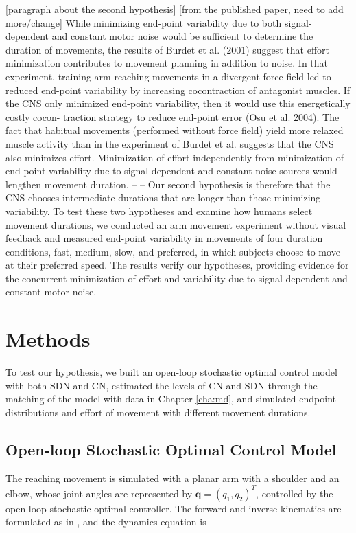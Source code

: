 [paragraph about the second hypothesis] [from the published paper, need to add more/change] While minimizing end-point variability due to both signal- dependent and constant motor noise would be sufficient to determine the duration of movements, the results of Burdet et al. (2001) suggest that effort minimization contributes to movement planning in addition to noise. In that experiment, training arm reaching movements in a divergent force field led to reduced end-point variability by increasing cocontraction of antagonist muscles. If the CNS only minimized end-point variability, then it would use this energetically costly cocon- traction strategy to reduce end-point error (Osu et al. 2004). The fact that habitual movements (performed without force field) yield more relaxed muscle activity than in the experiment of Burdet et al. suggests that the CNS also minimizes effort. Minimization of effort independently from minimization of end-point variability due to signal-dependent and constant noise sources would lengthen movement duration.  -- -- Our second hypothesis is therefore that the CNS chooses intermediate durations that are longer than those minimizing variability. To test these two hypotheses and examine how humans select movement durations, we conducted an arm movement experiment without visual feedback and measured end-point variability in movements of four duration conditions, fast, medium, slow, and preferred, in which subjects choose to move at their preferred speed. The results verify our hypotheses, providing evidence for the concurrent minimization of effort and variability due to signal-dependent and constant motor noise.


\section{Methods}
To test our hypothesis, we built an open-loop stochastic optimal control model with both SDN and CN, estimated the levels of CN and SDN through the matching of the model with data in Chapter \ref{cha:md}, and simulated endpoint distributions and effort of movement with different movement durations.

\subsection{Open-loop Stochastic Optimal Control Model}
The reaching movement is simulated with a planar arm with a shoulder and an elbow, whose joint angles are represented by $\bm{q} = (q_1, q_2)^T$, controlled by the open-loop stochastic optimal controller. 
The forward and inverse kinematics are formulated as in \cite{VanBeers2004}, and the dynamics equation is

